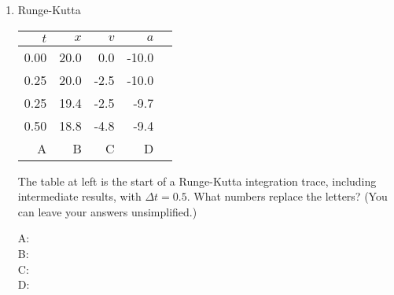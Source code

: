 \documentclass{article}
\begin{document}
\begin{enumerate}
\item Runge-Kutta
  
    \begin{minipage}{0.3\textwidth}
\begin{tabular}{r|rrrr}
$t$ & $x$ & $v$ & $a$ \\\hline
0.00  &  20.0  &  0.0  &  -10.0  &  \\
0.25  &  20.0  &  -2.5  &  -10.0  &  \\
0.25  &  19.4  &  -2.5  &  -9.7  &  \\
0.50  &  18.8  &  -4.8  &  -9.4  &  \\
A & B & C & D 
\end{tabular}
    \end{minipage}\hfill
    \begin{minipage}{0.65\textwidth}
      The table at left is the start of a Runge-Kutta integration trace,
      including intermediate results,
with $\Delta t = 0.5$. What numbers replace the letters? (You can
leave your answers unsimplified.)
\end{minipage}

\begin{description}
\item[A:]\vfill\item[B:]\vfill\item[C:]\vfill\item[D:]\vfill
\end{description}

\end{enumerate}
\end{document}
